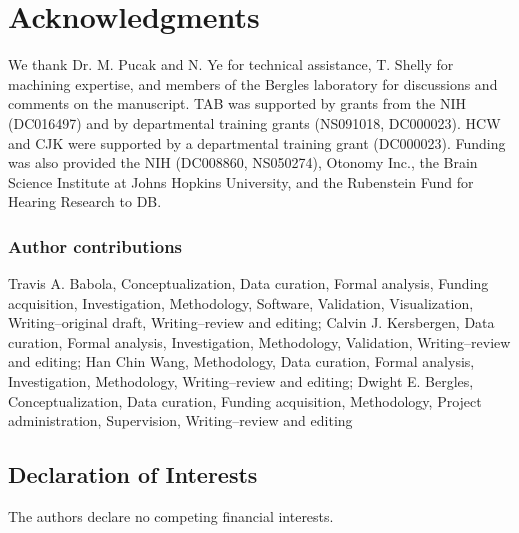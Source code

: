 \documentclass[9pt,lineno]{elife}
\begin{document}
\section{Acknowledgments}

We thank Dr. M. Pucak and N. Ye for technical assistance, T. Shelly for machining expertise, and members of the Bergles laboratory for discussions and comments on the manuscript. TAB was supported by grants from the NIH (DC016497) and by departmental training grants (NS091018, DC000023). HCW and CJK were supported by a departmental training grant (DC000023). Funding was also provided the NIH (DC008860, NS050274), Otonomy Inc., the Brain Science Institute at Johns Hopkins University, and the Rubenstein Fund for Hearing Research to DB. 

\subsubsection{Author contributions}
Travis A. Babola, Conceptualization, Data curation, Formal analysis, Funding acquisition, Investigation, Methodology, Software, Validation, Visualization, Writing--original draft, Writing--review and editing; Calvin J. Kersbergen, Data curation, Formal analysis, Investigation, Methodology, Validation, Writing--review and editing;
Han Chin Wang, Methodology, Data curation, Formal analysis, Investigation, Methodology, Writing--review and editing;
Dwight E. Bergles, Conceptualization, Data curation, Funding acquisition, Methodology, Project administration, Supervision, Writing--review and editing

\subsection{Declaration of Interests}
The authors declare no competing financial interests. 


\end{document}
